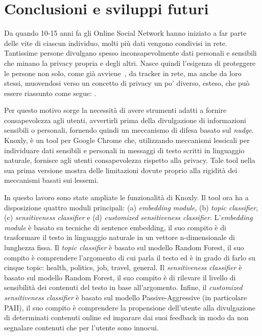 \chapter{Conclusioni e sviluppi futuri}
Da quando 10-15 anni fa gli Online Social Network hanno iniziato a far parte delle vite di ciascun individuo, molti più dati vengono condivisi in rete. Tantissime persone divulgano spesso inconsapevolmente dati personali e sensibili che minano la privacy propria e degli altri. Nasce quindi l'esigenza di proteggere le persone non solo, come già avviene~\cite{}, da tracker in rete, ma anche da loro stessi, muovendosi verso un concetto di privacy un po' diverso, esteso, che può essere riassunto come segue: \textit{ }.

Per questo motivo sorge la necessità di avere strumenti adatti a fornire consapevolezza agli utenti, avvertirli prima della divulgazione di informazioni sensibili o personali, fornendo quindi un meccanismo di difesa basato sul \textit{nudge}. Knoxly, è un tool per Google Chrome che, utilizzando meccanismi lessicali per individuare dati sensibili e personali in messaggi di testo scritti in linguaggio naturale, fornisce agli utenti consapevolezza rispetto alla privacy. Tale tool nella sua prima versione mostra delle limitazioni dovute proprio alla rigidità dei meccanismi basati sui lessemi. 

In questo lavoro sono state ampliate le funzionalità di Knoxly. Il tool ora ha a disposizione quattro moduli  principali: (a) \textit{embedding module}, (b) \textit{topic classifier}, (c) \textit{sensitiveness classifier} e (d) \textit{customized sensitiveness classifier}. L'\textit{embedding module} è basato su tecniche di sentence embedding, il suo compito è di trasformare il testo in linguaggio naturale in un vettore n-dimensionale di lunghezza fissa. Il \textit{topic classifier} è basato sul modello Random Forest, il suo compito è comprendere l'argomento di cui parla il testo ed è in grado di farlo su cinque topic: health, politics, job, travel, general. Il \textit{sensitiveness classifier} è basato sul modello Random Forest, il suo compito è di rilevare il livello di sensibilità dei contenuti del testo in base all'argomento. Infine, il \textit{customized sensitiveness classifier} è basato sul modello Passive-Aggressive (in particolare PAII), il suo compito è comprendere la propensione dell'utente alla divulgazione di determinati contenuti online ed imparare dai suoi feedback in modo da non segnalare contenuti che per l'utente sono innocui. 

